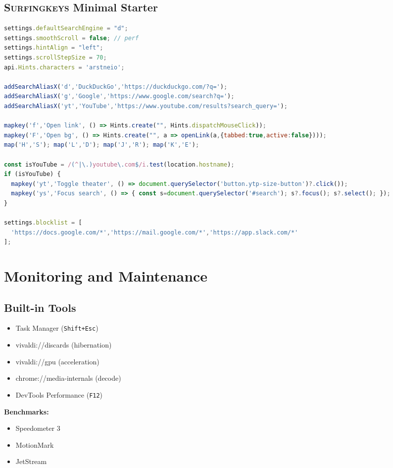 \documentclass[10pt,a4paper,oneside]{book}
\newcommand{\surfingkeys}{\textsc{Surfingkeys}}
\newcommand{\keystroke}[1]{\texttt{\color{accentred}#1}}
\begin{document}
\section{\surfingkeys{} Minimal Starter}
\begin{codebox}
\begin{lstlisting}[language=JavaScript]
settings.defaultSearchEngine = "d";
settings.smoothScroll = false; // perf
settings.hintAlign = "left";
settings.scrollStepSize = 70;
api.Hints.characters = 'arstneio';

addSearchAliasX('d','DuckDuckGo','https://duckduckgo.com/?q=');
addSearchAliasX('g','Google','https://www.google.com/search?q=');
addSearchAliasX('yt','YouTube','https://www.youtube.com/results?search_query=');

mapkey('f','Open link', () => Hints.create("", Hints.dispatchMouseClick));
mapkey('F','Open bg', () => Hints.create("", a => openLink(a,{tabbed:true,active:false})));
map('H','S'); map('L','D'); map('J','R'); map('K','E');

const isYouTube = /(^|\.)youtube\.com$/i.test(location.hostname);
if (isYouTube) {
  mapkey('yt','Toggle theater', () => document.querySelector('button.ytp-size-button')?.click());
  mapkey('ys','Focus search', () => { const s=document.querySelector('#search'); s?.focus(); s?.select(); });
}

settings.blocklist = [
  'https://docs.google.com/*','https://mail.google.com/*','https://app.slack.com/*'
];
\end{lstlisting}
\end{codebox}

\chapter{Monitoring and Maintenance}
\section{Built-in Tools}
\begin{multicols}{2}
\begin{itemize}
  \item Task Manager (\keystroke{Shift+Esc})
  \item vivaldi://discards (hibernation)
  \item vivaldi://gpu (acceleration)
  \item chrome://media-internals (decode)
  \item DevTools Performance (\keystroke{F12})
\end{itemize}
\columnbreak
\textbf{Benchmarks:}
\begin{itemize}
  \item Speedometer 3
  \item MotionMark
  \item JetStream
\end{itemize}
\end{multicols}
\end{document}
